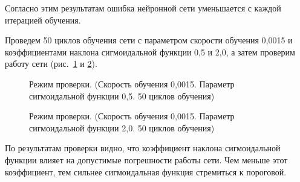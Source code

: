 Согласно этим результатам ошибка нейронной сети уменьшается с каждой итерацией обучения.

Проведем 50 циклов обучения сети с параметром скорости обучения 0,0015 и коэффициентами наклона сигмоидальной функции 0,5 и 2,0, а затем проверим работу сети (рис.~\ref{ris:check_0,0015_0,5_50} и \ref{ris:check_0,0015_2,0_50}).

\begin{figure}[h]
\caption{Режим проверки. (Скорость обучения 0,0015. Параметр сигмоидальной функции 0,5. 50 циклов обучения)}
\label{ris:check_0,0015_0,5_50}
\end{figure}

\begin{figure}[h]
\caption{Режим проверки. (Скорость обучения 0,0015. Параметр сигмоидальной функции 2,0. 50 циклов обучения)}
\label{ris:check_0,0015_2,0_50}
\end{figure}

По результатам проверки видно, что коэффициент наклона сигмоидальной функции влияет на допустимые погрешности работы сети. Чем меньше этот коэффициент, тем сильнее сигмоидальная функция стремиться к пороговой.